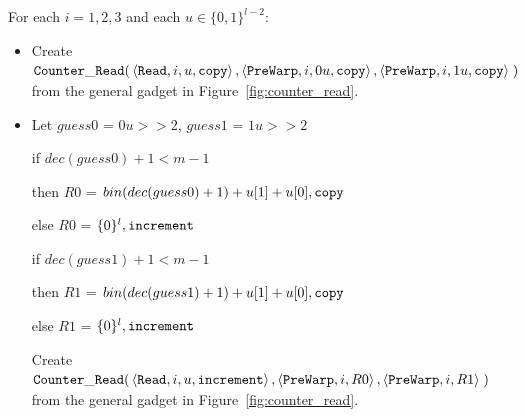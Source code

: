 For each $i = 1,2,3$ and each $u \in \{0, 1\}^{l-2}$:
\begin{itemize}

    \item Create
        $\begin{aligned}[t]
            {\tt Counter\_Read}(& \left\langle {\tt Read},    i,  u, {\tt copy} \right\rangle,
                       \left\langle {\tt PreWarp}, i, 0u, {\tt copy} \right\rangle,
                       \left\langle {\tt PreWarp}, i, 1u, {\tt copy} \right\rangle \;)
        \end{aligned}$\\from the general gadget in Figure~\ref{fig:counter_read}.

    \item Let $guess0$ = $0u >> 2$, $guess1$ = $1u >> 2$

    \vspace{.5cm}
    if $dec(guess0) + 1 < m - 1$

    then $R0$ = $bin(dec(guess0) + 1)+u[1]+u[0], {\tt copy}$

    else $R0$ = $\{0 \}^l, {\tt increment}$

    \vspace{.5cm}

    if $dec(guess1) + 1 < m - 1$

    then $R1$ = $bin(dec(guess1) + 1)+u[1]+u[0], {\tt copy}$

    else $R1$ = $\{0 \}^l, {\tt increment}$

    \vspace{.5cm}

    Create
    $\begin{aligned}[t]
        {\tt Counter\_Read}(& \left\langle {\tt Read},    i,  u, {\tt increment} \right\rangle,
                   \left\langle {\tt PreWarp}, i, R0                  \right\rangle,
                   \left\langle {\tt PreWarp}, i, R1                  \right\rangle \;)
    \end{aligned}$\\from the general gadget in Figure~\ref{fig:counter_read}.

\end{itemize}

